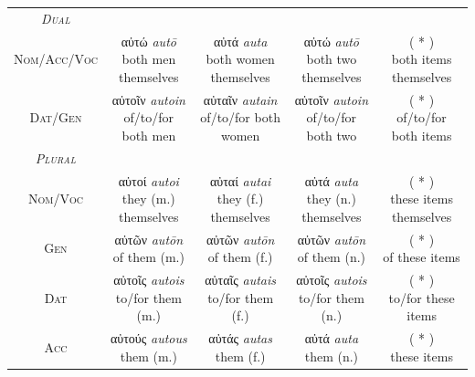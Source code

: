 \documentclass[10pt,a4paper,notitlepage]{article}
\newcommand{\tsc}[1]{\textsc{#1}}
\newcommand*{\grc}[1]{\fontspec{Inter}#1\rmfamily}
\newcommand{\trc}[1]{\textit{\fontspec{Tinos}#1}}
\begin{document}
\begin{table}[H]
\begin{tabular}{c|ccc|c}
            \hline
            \emph{\tsc{Dual}} & & & & \\
            \tsc{Nom/Acc/Voc} & \makecell{\grc{αὐτώ} \trc{autō} \\ \small both men themselves} & \makecell{\grc{αὐτά} \trc{auta} \\ \small both women themselves} & \makecell{\grc{αὐτώ} \trc{autō} \\ \small both two themselves} & \makecell{( * ) \\ \small both items themselves} \\
            \tsc{Dat/Gen} & \makecell{\grc{αὐτοῖν} \trc{autoin} \\ \small of/to/for both men} & \makecell{\grc{αὐταῖν} \trc{autain} \\ \small of/to/for both women} & \makecell{\grc{αὐτοῖν} \trc{autoin} \\ \small of/to/for both two} & \makecell{( * ) \\ \small of/to/for both items} \\
            \hline
            \emph{\tsc{Plural}} & & & & \\
            \tsc{Nom/Voc} & \makecell{\grc{αὐτοί} \trc{autoi} \\ \small they (m.) themselves} & \makecell{\grc{αὐταί} \trc{autai} \\ \small they (f.) themselves} & \makecell{\grc{αὐτά} \trc{auta} \\ \small they (n.) themselves} & \makecell{( * ) \\ \small these items themselves} \\
            \tsc{Gen} & \makecell{\grc{αὐτῶν} \trc{autōn} \\ \small of them (m.)} & \makecell{\grc{αὐτῶν} \trc{autōn} \\ \small of them (f.)} & \makecell{\grc{αὐτῶν} \trc{autōn} \\ \small of them (n.)} & \makecell{( * ) \\ \small of these items} \\
            \tsc{Dat} & \makecell{\grc{αὐτοῖς} \trc{autois} \\ \small to/for them (m.)} & \makecell{\grc{αὐταῖς} \trc{autais}\\ \small to/for them (f.)} & \makecell{\grc{αὐτοῖς} \trc{autois} \\ \small to/for them (n.)} & \makecell{( * ) \\ \small to/for these items} \\
            \tsc{Acc} & \makecell{\grc{αὐτούς} \trc{autous} \\ \small them (m.)} & \makecell{\grc{αὐτάς} \trc{autas} \\ \small them (f.)} & \makecell{\grc{αὐτά} \trc{auta} \\ \small them (n.)} & \makecell{( * ) \\ \small these items} \\

\end{tabular}
\end{table}
\end{document}
